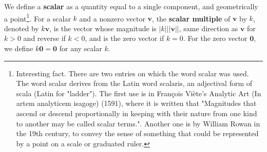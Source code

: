 \begin{definition}
    We define a \textbf{scalar} as a quantity equal to a single component, and geometrically a point\footnote{Interesting fact. There are two entries on which the word scalar was used. The word scalar derives from the Latin word scalaris, an adjectival form of scala (Latin for "ladder"). The first use is in François Viète's Analytic Art (In artem analyticem isagoge) (1591), where it is written that "Magnitudes that ascend or descend proportionally in keeping with their nature from one kind to another may be called scalar terms.". Another one is by William Rowan in the 19th century, to convey the sense of something that could be represented by a point on a scale or graduated ruler.}. For a scalar $k$ and a nonzero vector $\mathbf{v}$, the \textbf{scalar multiple} of $\mathbf{v}$ by $k$, denoted by $k\mathbf{v}$, is the vector whose magnitude is $\lvert k\rvert \lvert \lvert \mathbf{v}\rvert\rvert $, same direction as $\mathbf{v}$ for $k>0$ and reverse if $k<0$, and is the zero vector if $k=0$. For the zero vector $\mathbf{0}$, we define $k\mathbf{0}=\mathbf{0}$ for any scalar $k$. 
\end{definition}

